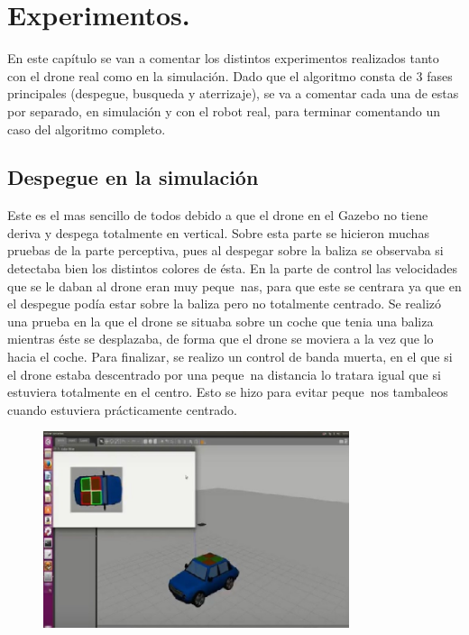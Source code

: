 \chapter{Experimentos.}\label{cap.experimentos}
\hspace{1cm} En este cap\'itulo se van a comentar los distintos experimentos realizados tanto con el drone real como en la simulaci\'on. Dado que el algoritmo consta de 3 fases principales (despegue, busqueda y aterrizaje), se va a comentar cada una de estas por separado, en simulaci\'on y con el robot real, para terminar comentando un caso del algoritmo completo. 

\section{Despegue en la simulaci\'on}
\hspace{1cm} Este es el mas sencillo de todos debido a que el drone en el Gazebo no tiene deriva y despega totalmente en vertical. Sobre esta parte se hicieron muchas pruebas de la parte perceptiva, pues al despegar sobre la baliza se observaba si detectaba bien los distintos colores de \'esta. En la parte de control las velocidades que se le daban al drone eran muy peque~nas, para que este se centrara ya que en el despegue pod\'ia estar sobre la baliza pero no totalmente centrado. 
\hspace{1cm} Se realiz\'o una prueba en la que el drone se situaba sobre un coche que tenia una baliza mientras \'este se desplazaba, de forma que el drone se moviera a la vez que lo hacia el coche. 
\hspace{1cm} Para finalizar, se realizo un control de banda muerta, en el que si el drone estaba descentrado por una peque~na distancia lo tratara igual que si estuviera totalmente en el centro. Esto se hizo para evitar peque~nos tambaleos cuando estuviera pr\'acticamente centrado. 


\begin{figure}[H]
	\centering
		\includegraphics[width=0.8\textwidth]{imgs/TakeOff.jpg}
	\label{fig:Despegue sobre la baliza del coche.}
\end{figure}

